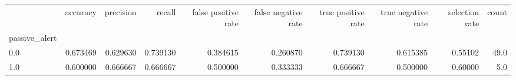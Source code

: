 \begin{tabular}{lrrrrrrrrr}
\toprule
{} &  accuracy &  precision &    recall &  false positive rate &  false negative rate &  true positive rate &  true negative rate &  selection rate &  count \\
passive\_alert &           &            &           &                      &                      &                     &                     &                 &        \\
\midrule
0.0           &  0.673469 &   0.629630 &  0.739130 &             0.384615 &             0.260870 &            0.739130 &            0.615385 &         0.55102 &   49.0 \\
1.0           &  0.600000 &   0.666667 &  0.666667 &             0.500000 &             0.333333 &            0.666667 &            0.500000 &         0.60000 &    5.0 \\
\bottomrule
\end{tabular}
